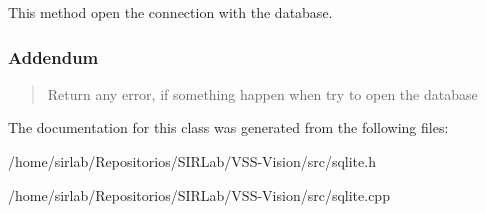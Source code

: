 This method open the connection with the database. 

\subsubsection*{Addendum }\begin{quotation}
Return any error, if something happen when try to open the database \end{quotation}


The documentation for this class was generated from the following files\-:\begin{DoxyCompactItemize}
\item 
/home/sirlab/\-Repositorios/\-S\-I\-R\-Lab/\-V\-S\-S-\/\-Vision/src/sqlite.\-h\item 
/home/sirlab/\-Repositorios/\-S\-I\-R\-Lab/\-V\-S\-S-\/\-Vision/src/sqlite.\-cpp\end{DoxyCompactItemize}
